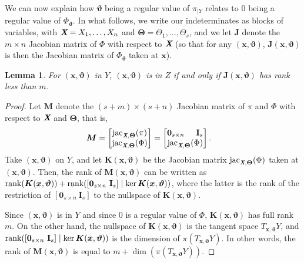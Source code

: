 \documentclass[12pt]{article}
\def\Xb{\textit{\textbf{X}}}
\def\Thetab{\bm{\Theta}}
\def\thetab{\bm{\vartheta}}
\def\xb{{\bm x}}
\DeclareMathOperator{\jac}{jac}
\def\dt{s}
\def\bbm{\begin{bmatrix}}
\def\ebm{\end{bmatrix}}
\newtheorem{lemma}[theorem]{Lemma}
\begin{document}
\noindent 
We can now explain how $\thetab$ being a regular value of $\pi_{|Y}$
relates to $0$ being a regular value of $\Phi_{\thetab}$. In what
follows, we write our indeterminates as blocks of variables, with
$\Xb=X_1,\dots,X_n$ and $\Thetab = \Theta_1,\dots,\Theta_s$, and we
let $\bm J$ denote the $m \times n$ Jacobian matrix of $\Phi$ with
respect to $\Xb$ (so that for any $(\xb,\thetab)$, $\bm
J(\xb,\thetab)$ is then the Jacobian matrix of $\Phi_{\thetab}$ taken
at $\xb$).


\begin{lemma}\label{prop:rankJ}
  For $(\xb,\thetab)$ in $Y$, $(\xb,\thetab)$ is in $Z$ if and only if
  $\bm J(\xb,\thetab)$ has rank less than $m$.
\end{lemma}
\begin{proof}
  Let
  $\bm M$ denote the $(s+m) \times (s+n)$ Jacobian matrix of $\pi$
  and $\Phi$ with respect to $\Xb$ and $\Thetab$, 
  that is,
  \begin{align*}
    \bm M &= 
    \bbm 
    \jac_{\Xb,\Thetab}(\pi)\\
    \jac_{\Xb,\Thetab}(\Phi) 
    \ebm 
    =
    \bbm 
    \textbf{0}_{\dt \times n}\hspace{5mm}\textbf{I}_{\dt} \\
    \jac_{\Xb,\Thetab}(\Phi)
    \ebm.
  \end{align*}
  Take $(\xb,\thetab)$ on $Y$, and let $\bm K(\xb,\thetab)$ be the
  Jacobian matrix $\jac_{\Xb,\Thetab}(\Phi)$ taken at $(\xb,\thetab)$.
  Then, the rank of $\bm M(\xb,\thetab)$ can be written as
  $\textup{rank}(\bm K(\xb,\thetab)) + \textup{rank}([\textbf{0}_{\dt
      \times n}~\textbf{I}_{\dt}] \mid \ker \bm K(\xb,\thetab))$, where
  the latter is the rank of the restriction of $[\textbf{0}_{\dt
      \times n}~\textbf{I}_{\dt}]$ to the nullspace of
  $\bm K(\xb,\thetab)$.

  Since $(\xb,\thetab)$ is in $Y$ and since $0$ is a regular value of
  $\Phi$, $\bm K(\xb,\thetab)$ has full rank $m$. On the other hand,
  the nullspace of $\bm K(\xb,\thetab)$ is the tangent space
  $T_{\xb,\thetab} Y$, and $\textup{rank}([\textbf{0}_{\dt \times
      n}~\textbf{I}_{\dt}] \mid \ker \bm K(\xb,\thetab))$ is the
  dimension of $\pi(T_{\xb,\thetab} Y)$.  In other words, the rank of
  $\bm M(\xb,\thetab)$ is equal to $m+\dim(\pi(T_{\xb,\thetab} Y))$.


\end{proof}
\end{document}
